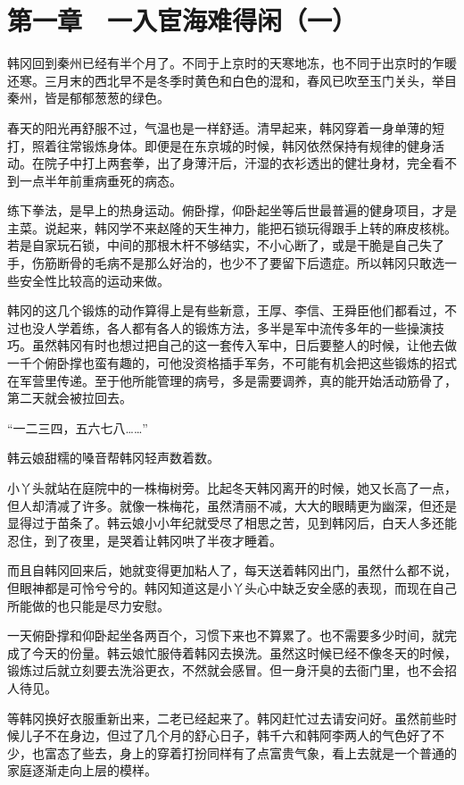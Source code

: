 \section{第一章　一入宦海难得闲（一）}

韩冈回到秦州已经有半个月了。不同于上京时的天寒地冻，也不同于出京时的乍暖还寒。三月末的西北早不是冬季时黄色和白色的混和，春风已吹至玉门关头，举目秦州，皆是郁郁葱葱的绿色。

春天的阳光再舒服不过，气温也是一样舒适。清早起来，韩冈穿着一身单薄的短打，照着往常锻炼身体。即便是在东京城的时候，韩冈依然保持有规律的健身活动。在院子中打上两套拳，出了身薄汗后，汗湿的衣衫透出的健壮身材，完全看不到一点半年前重病垂死的病态。

练下拳法，是早上的热身运动。俯卧撑，仰卧起坐等后世最普遍的健身项目，才是主菜。说起来，韩冈学不来赵隆的天生神力，能把石锁玩得跟手上转的麻皮核桃。若是自家玩石锁，中间的那根木杆不够结实，不小心断了，或是干脆是自己失了手，伤筋断骨的毛病不是那么好治的，也少不了要留下后遗症。所以韩冈只敢选一些安全性比较高的运动来做。

韩冈的这几个锻炼的动作算得上是有些新意，王厚、李信、王舜臣他们都看过，不过也没人学着练，各人都有各人的锻炼方法，多半是军中流传多年的一些操演技巧。虽然韩冈有时也想过把自己的这一套传入军中，日后要整人的时候，让他去做一千个俯卧撑也蛮有趣的，可他没资格插手军务，不可能有机会把这些锻炼的招式在军营里传递。至于他所能管理的病号，多是需要调养，真的能开始活动筋骨了，第二天就会被拉回去。

“一二三四，五六七八……”

韩云娘甜糯的嗓音帮韩冈轻声数着数。

小丫头就站在庭院中的一株梅树旁。比起冬天韩冈离开的时候，她又长高了一点，但人却清减了许多。就像一株梅花，虽然清丽不减，大大的眼睛更为幽深，但还是显得过于苗条了。韩云娘小小年纪就受尽了相思之苦，见到韩冈后，白天人多还能忍住，到了夜里，是哭着让韩冈哄了半夜才睡着。

而且自韩冈回来后，她就变得更加粘人了，每天送着韩冈出门，虽然什么都不说，但眼神都是可怜兮兮的。韩冈知道这是小丫头心中缺乏安全感的表现，而现在自己所能做的也只能是尽力安慰。

一天俯卧撑和仰卧起坐各两百个，习惯下来也不算累了。也不需要多少时间，就完成了今天的份量。韩云娘忙服侍着韩冈去换洗。虽然这时候已经不像冬天的时候，锻炼过后就立刻要去洗浴更衣，不然就会感冒。但一身汗臭的去衙门里，也不会招人待见。

等韩冈换好衣服重新出来，二老已经起来了。韩冈赶忙过去请安问好。虽然前些时候儿子不在身边，但过了几个月的舒心日子，韩千六和韩阿李两人的气色好了不少，也富态了些去，身上的穿着打扮同样有了点富贵气象，看上去就是一个普通的家庭逐渐走向上层的模样。

